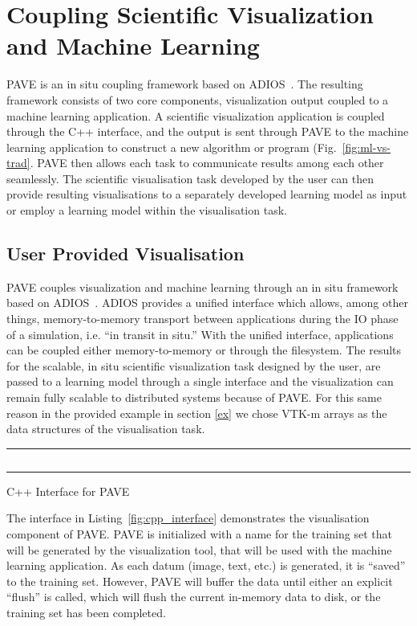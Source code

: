 \section{Coupling Scientific Visualization and Machine Learning}
PAVE is an in situ coupling framework based on ADIOS~\cite{doi:10.1002/cpe.3125}. The resulting framework consists of two core components, visualization output coupled to a machine learning application. A scientific visualization application is coupled through the C++ interface, and the output is sent through PAVE to the machine learning application to construct a new algorithm or program (Fig.~\ref{fig:ml-vs-trad}. PAVE then allows each task to communicate results among each other seamlessly. The scientific visualisation task developed by the user can then provide resulting visualisations to a separately developed learning model as input or employ a learning model within the visualisation task.  



\subsection{User Provided Visualisation}

PAVE couples visualization and machine learning through an in situ framework based on ADIOS~\cite{doi:10.1002/cpe.3125}. ADIOS provides a unified interface which allows, among other things, memory-to-memory transport between applications during the IO phase of a simulation, i.e. ``in transit in situ.'' With the  unified interface, applications can be coupled either memory-to-memory or through the filesystem. The results for the scalable, in situ scientific visualization task designed by the user, are passed to a learning model through a single interface and the visualization can remain fully scalable to distributed systems because of PAVE. For this same reason in the provided example in section \ref{ex} we chose VTK-m arrays as the data structures of the visualisation task. 

\begin{listing}[htb]
\noindent\rule{0.5\textwidth}{1pt}
\inputminted{cpp}{pave_pt.py}\label{PAVEvis}
\noindent\rule{0.5\textwidth}{1pt}
\caption{C++ Interface for PAVE}
\label{fig:cpp_interface}
\end{listing}

The interface in Listing~\ref{fig:cpp_interface} demonstrates the visualisation component of PAVE. PAVE is initialized with a name for the training set that will be generated by the visualization tool, that will be used with the machine learning application. As each datum (image, text, etc.) is generated, it is ``saved'' to the training set. However, PAVE will buffer the data until either an explicit ``flush'' is called, which will flush the current in-memory data to disk, or the training set has been completed. 

